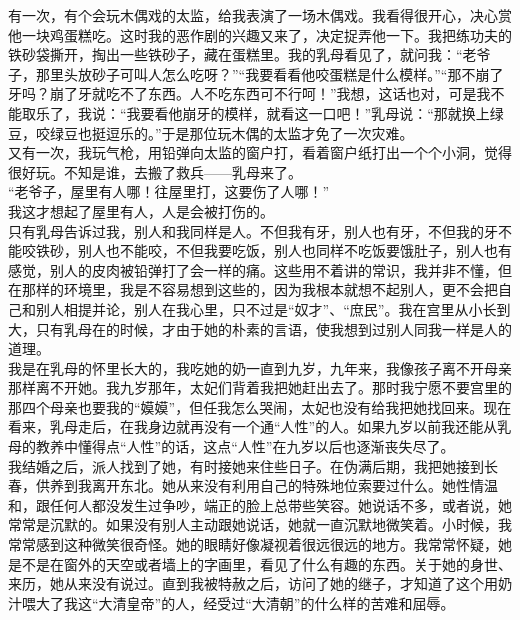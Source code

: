 有一次，有个会玩木偶戏的太监，给我表演了一场木偶戏。我看得很开心，决心赏他一块鸡蛋糕吃。这时我的恶作剧的兴趣又来了，决定捉弄他一下。我把练功夫的铁砂袋撕开，掏出一些铁砂子，藏在蛋糕里。我的乳母看见了，就问我：“老爷子，那里头放砂子可叫人怎么吃呀？”“我要看看他咬蛋糕是什么模样。”“那不崩了牙吗？崩了牙就吃不了东西。人不吃东西可不行呵！”我想，这话也对，可是我不能取乐了，我说：“我要看他崩牙的模样，就看这一口吧！”乳母说：“那就换上绿豆，咬绿豆也挺逗乐的。”于是那位玩木偶的太监才免了一次灾难。\\

又有一次，我玩气枪，用铅弹向太监的窗户打，看着窗户纸打出一个个小洞，觉得很好玩。不知是谁，去搬了救兵——乳母来了。\\

“老爷子，屋里有人哪！往屋里打，这要伤了人哪！”\\

我这才想起了屋里有人，人是会被打伤的。\\

只有乳母告诉过我，别人和我同样是人。不但我有牙，别人也有牙，不但我的牙不能咬铁砂，别人也不能咬，不但我要吃饭，别人也同样不吃饭要饿肚子，别人也有感觉，别人的皮肉被铅弹打了会一样的痛。这些用不着讲的常识，我并非不懂，但在那样的环境里，我是不容易想到这些的，因为我根本就想不起别人，更不会把自己和别人相提并论，别人在我心里，只不过是“奴才”、“庶民”。我在宫里从小长到大，只有乳母在的时候，才由于她的朴素的言语，使我想到过别人同我一样是人的道理。\\

我是在乳母的怀里长大的，我吃她的奶一直到九岁，九年来，我像孩子离不开母亲那样离不开她。我九岁那年，太妃们背着我把她赶出去了。那时我宁愿不要宫里的那四个母亲也要我的“嫫嫫”，但任我怎么哭闹，太妃也没有给我把她找回来。现在看来，乳母走后，在我身边就再没有一个通“人性”的人。如果九岁以前我还能从乳母的教养中懂得点“人性”的话，这点“人性”在九岁以后也逐渐丧失尽了。\\

我结婚之后，派人找到了她，有时接她来住些日子。在伪满后期，我把她接到长春，供养到我离开东北。她从来没有利用自己的特殊地位索要过什么。她性情温和，跟任何人都没发生过争吵，端正的脸上总带些笑容。她说话不多，或者说，她常常是沉默的。如果没有别人主动跟她说话，她就一直沉默地微笑着。小时候，我常常感到这种微笑很奇怪。她的眼睛好像凝视着很远很远的地方。我常常怀疑，她是不是在窗外的天空或者墙上的字画里，看见了什么有趣的东西。关于她的身世、来历，她从来没有说过。直到我被特赦之后，访问了她的继子，才知道了这个用奶汁喂大了我这“大清皇帝”的人，经受过“大清朝”的什么样的苦难和屈辱。\\

